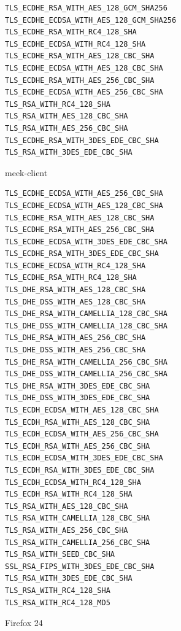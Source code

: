 \documentclass[conference]{IEEEtran}
\begin{document}
\begin{figure}
\centering
\begin{subfigure}[t]{0.30\textwidth}
\begin{minipage}[t][17ex][t]{0.30\textwidth}
\tiny
\begin{verbatim}
TLS_ECDHE_RSA_WITH_AES_128_GCM_SHA256
TLS_ECDHE_ECDSA_WITH_AES_128_GCM_SHA256
TLS_ECDHE_RSA_WITH_RC4_128_SHA
TLS_ECDHE_ECDSA_WITH_RC4_128_SHA
TLS_ECDHE_RSA_WITH_AES_128_CBC_SHA
TLS_ECDHE_ECDSA_WITH_AES_128_CBC_SHA
TLS_ECDHE_RSA_WITH_AES_256_CBC_SHA
TLS_ECDHE_ECDSA_WITH_AES_256_CBC_SHA
TLS_RSA_WITH_RC4_128_SHA
TLS_RSA_WITH_AES_128_CBC_SHA
TLS_RSA_WITH_AES_256_CBC_SHA
TLS_ECDHE_RSA_WITH_3DES_EDE_CBC_SHA
TLS_RSA_WITH_3DES_EDE_CBC_SHA
\end{verbatim}
\end{minipage}
\caption{meek-client}
\label{fig:ciphersuites:meek-client}
\end{subfigure}
%
\begin{subfigure}[t]{0.30\textwidth}
\begin{minipage}[t][48ex][t]{0.30\textwidth}
\tiny
\begin{verbatim}
TLS_ECDHE_ECDSA_WITH_AES_256_CBC_SHA
TLS_ECDHE_ECDSA_WITH_AES_128_CBC_SHA
TLS_ECDHE_RSA_WITH_AES_128_CBC_SHA
TLS_ECDHE_RSA_WITH_AES_256_CBC_SHA
TLS_ECDHE_ECDSA_WITH_3DES_EDE_CBC_SHA
TLS_ECDHE_RSA_WITH_3DES_EDE_CBC_SHA
TLS_ECDHE_ECDSA_WITH_RC4_128_SHA
TLS_ECDHE_RSA_WITH_RC4_128_SHA
TLS_DHE_RSA_WITH_AES_128_CBC_SHA
TLS_DHE_DSS_WITH_AES_128_CBC_SHA
TLS_DHE_RSA_WITH_CAMELLIA_128_CBC_SHA
TLS_DHE_DSS_WITH_CAMELLIA_128_CBC_SHA
TLS_DHE_RSA_WITH_AES_256_CBC_SHA
TLS_DHE_DSS_WITH_AES_256_CBC_SHA
TLS_DHE_RSA_WITH_CAMELLIA_256_CBC_SHA
TLS_DHE_DSS_WITH_CAMELLIA_256_CBC_SHA
TLS_DHE_RSA_WITH_3DES_EDE_CBC_SHA
TLS_DHE_DSS_WITH_3DES_EDE_CBC_SHA
TLS_ECDH_ECDSA_WITH_AES_128_CBC_SHA
TLS_ECDH_RSA_WITH_AES_128_CBC_SHA
TLS_ECDH_ECDSA_WITH_AES_256_CBC_SHA
TLS_ECDH_RSA_WITH_AES_256_CBC_SHA
TLS_ECDH_ECDSA_WITH_3DES_EDE_CBC_SHA
TLS_ECDH_RSA_WITH_3DES_EDE_CBC_SHA
TLS_ECDH_ECDSA_WITH_RC4_128_SHA
TLS_ECDH_RSA_WITH_RC4_128_SHA
TLS_RSA_WITH_AES_128_CBC_SHA
TLS_RSA_WITH_CAMELLIA_128_CBC_SHA
TLS_RSA_WITH_AES_256_CBC_SHA
TLS_RSA_WITH_CAMELLIA_256_CBC_SHA
TLS_RSA_WITH_SEED_CBC_SHA
SSL_RSA_FIPS_WITH_3DES_EDE_CBC_SHA
TLS_RSA_WITH_3DES_EDE_CBC_SHA
TLS_RSA_WITH_RC4_128_SHA
TLS_RSA_WITH_RC4_128_MD5
\end{verbatim}
\end{minipage}
\caption{Firefox 24}
\label{fig:ciphersuites:firefox}
\end{subfigure}
%
\begin{subfigure}[t]{0.30\textwidth}

\end{subfigure}
\end{figure}
\end{document}
